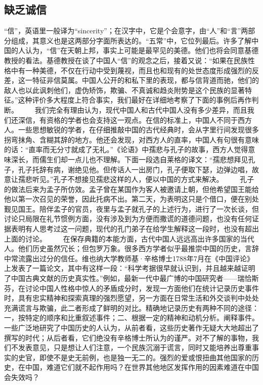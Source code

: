 \documentclass[12pt,oneside]{book}
\begin{document}
\begin{common-format}
\chapter{缺乏诚信}
“信”，英语里一般译为“sincerity”；在汉字中，它是个会意字，由“人”和“言”两部分组成，其意义也是这两部分字面所表达的。“五常”中，它位列最后。许多了解中国的人认为，“信”在天朝上邦，事实上可能是最罕见的美德。他们也将会同意基德教授的看法。基德教授在谈了中国人“信”的观念之后，接着又说：“如果在民族性格中有一种美德，不仅在行动中受到蔑视，而且也和现有的处世态度形成强烈的反差，这一特征非信莫属。中国人公开的和私下里的表现，都与信背道而驰，他们的敌人也以此讽刺他们，虚伪矫饰，欺骗、不真诚和趋炎附势是这个民族的显著特征。”这种评价多大程度上符合事实，我们最好在详细地考察了下面的事例后再作判断。 
　　我们完全有理由认为，现代中国人和古代中国人没有多少差异，而且我们还深信，有资格的学者也会支持这一观点。在信的标准上，中国人不同于西方人。一些思想敏锐的学者，在仔细推敲中国的古代经典时，会从字里行间发现很多拐弯抹角、含糊其辞的地方。他还会发现，对西方人的直率，中国人有句很有意味的话：“直率而无分寸就成了无礼。”《论语》中孺悲与孔子的故事，西方人觉得意味深长，而儒生们却一点儿也不理解。下面一段选自莱格的译文：“孺悲想拜见孔子，孔子托辞有病，谢绝见他。但传话人一出房门，孔子便取下瑟，边弹边唱，故意让孺悲听见。”孔子不想接见孺悲这样的人，便以中国的方式来解决。 
　　孔子的做法后来为孟子所仿效。孟子曾在某国作为客人被邀请上朝，但他希望国王能给他以第一次召见的荣誉，因此托病不出。第二天，为表明这只是个借口，便在别处觐见国王。陪伴孟子的官员，夜里与孟子就孔子的上述行为，进行了一次长谈，但讨论只局限在礼节惯例方面，没有涉及到为方便而撒谎的道德问题，也没有任何证据表明有人思考过这一问题，现代的孔门弟子在给学生解释这一段时，也没有超出上面的讨论。 
　　在保存典籍的本能方面，古代中国人远远高出许多国家的当代人。他们历史虽然冗长；但包罗万象。很多西方学者似乎最推崇中国的历史，言辞中常流露出过分的信任。维也纳大学教师基·辛格博士1788年7月在《中国评论》上发表了一篇论文，其中有这样一段：“科学考据很早就认识到，并且越来越证明了中国古典文献的历史真实性。”例如，最新一代中最广博的中国研究者——瑞恰斯芬，在讨论中国人性格中惊人的矛盾成分时，发现一方面他们在统计记录历史事件时，具有忠实精神和探索真理的强烈愿望，另一方面在日常生活和外交谈判中处处充满谎言与欺骗，此二者形成了鲜明的对比。精确地记录历史有两种不同的途径：一，按特定的顺序和比重叙述事件；二、根据一定的精神和动机分析。阐释事件。一些广泛地研究了中国历史的人认为，从前者看，这些历史著作无疑大大地超出了撰写的时代；从后者看，它们绝没有辛格博士所认为的谨严。对不了解的事物，我们不发表意见，只是想让人们注意，一个民族沉溺于谎言，同时又能培养出尊重事实的史官，即使不是史无前例，也是独一无二的。强烈的爱或恨扭曲其他国家的历史，在中国，难道它们就不起作用吗？在世界其他地区发挥作用的因素难道在中国会失效吗？ 

\end{common-format}
\end{document}
